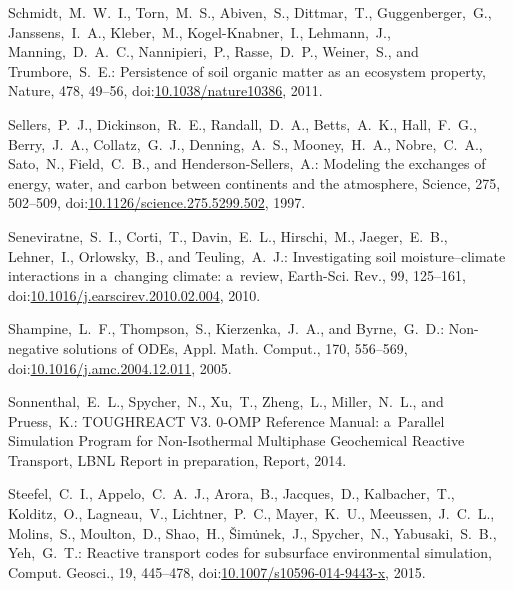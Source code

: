 \documentclass[gmd,noline]{copernicus}
\begin{document}
\begin{thebibliography}{55}
Schmidt,~M.~W.~I., Torn,~M.~S., Abiven,~S., Dittmar,~T., Guggenberger,~G.,
Janssens,~I.~A., Kleber,~M., Kogel-Knabner,~I., Lehmann,~J.,
Manning,~D.~A.~C., Nannipieri,~P., Rasse,~D.~P., Weiner,~S., and
Trumbore,~S.~E.: Persistence of soil organic matter as an ecosystem property,
Nature, 478, 49--56,
doi:\href{http://dx.doi.org/10.1038/nature10386}{10.1038/nature10386}, 2011.


Sellers,~P.~J., Dickinson,~R.~E., Randall,~D.~A., Betts,~A.~K., Hall,~F.~G.,
Berry,~J.~A., Collatz,~G.~J., Denning,~A.~S., Mooney,~H.~A., Nobre,~C.~A.,
Sato,~N., Field,~C.~B., and Henderson-Sellers,~A.: Modeling the exchanges of
energy, water, and carbon between continents and the atmosphere, Science,
275, 502--509,
doi:\href{http://dx.doi.org/10.1126/science.275.5299.502}{10.1126/science.275.5299.502},
1997.


Seneviratne,~S.~I., Corti,~T., Davin,~E.~L., Hirschi,~M., Jaeger,~E.~B., Lehner,~I., Orlowsky,~B., and Teuling,~A.~J.:
Investigating soil moisture--climate interactions in a~changing climate: a~review,
Earth-Sci. Rev.,
99, 125--161,
doi:\href{http://dx.doi.org/10.1016/j.earscirev.2010.02.004}{10.1016/j.earscirev.2010.02.004}, 2010.


Shampine,~L.~F., Thompson,~S., Kierzenka,~J.~A., and Byrne,~G.~D.:
Non-negative solutions of ODEs,
Appl. Math. Comput.,
170, 556--569,
doi:\href{http://dx.doi.org/10.1016/j.amc.2004.12.011}{10.1016/j.amc.2004.12.011}, 2005.


Sonnenthal,~E.~L., Spycher,~N., Xu,~T., Zheng,~L., Miller,~N.~L., and Pruess,~K.:
TOUGHREACT V3. 0-OMP Reference Manual: a~Parallel Simulation Program for Non-Isothermal Multiphase Geochemical Reactive Transport,
LBNL Report in preparation, Report,
 2014.



Steefel,~C.~I., Appelo,~C.~A.~J., Arora,~B., Jacques,~D., Kalbacher,~T.,
Kolditz,~O., Lagneau,~V., Lichtner,~P.~C., Mayer,~K.~U., Meeussen,~J.~C.~L.,
Molins,~S., Moulton,~D., Shao,~H., \v{S}im\.{u}nek,~J., Spycher,~N.,
Yabusaki,~S.~B., Yeh,~G.~T.: Reactive transport codes for subsurface
environmental simulation, Comput. Geosci., 19, 445--478,
doi:\href{http://dx.doi.org/10.1007/s10596-014-9443-x}{10.1007/s10596-014-9443-x},
2015.




\end{thebibliography}
\end{document}
